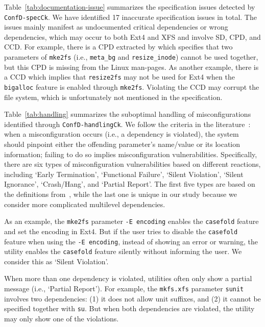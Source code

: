 Table~\ref{tab:documentation-issue} summarizes the specification issues detected by  \texttt{ConfD-specCk}.
We have identified 17 inaccurate specification issues in total.
The issues mainly manifest as undocumented critical dependencies or wrong dependencies, which may occur to both Ext4 and XFS and involve SD, CPD, and CCD. For example, there is a CPD extracted by \prj which specifies that two  parameters of   \texttt{mke2fs} (i.e., \texttt{meta\_bg} and \texttt{resize\_inode})  cannot be used together, but this CPD is missing from the Linux man-pages.
 As another example, there is a CCD which implies that \texttt{resize2fs} may not be used for Ext4 when the \texttt{bigalloc} feature is enabled through \texttt{mke2fs}. Violating the CCD may corrupt the file system, which is unfortunately not mentioned in the specification. 

Table~\ref{tab:handling} summarizes the suboptimal handling of misconfigurations identified through \texttt{ConfD-handlingCk}. 
We follow the criteria in the literature~\cite{spex}: when a misconfiguration occurs (i.e., a dependency is violated),  the system should pinpoint either the offending parameter's name/value or its location information; failing to do so implies misconfiguration vulnerabilities. 
Specifically, there are six types of misconfiguration vulnerabilities based on different reactions, including  
`Early Termination', `Functional Failure', `Silent Violation',  `Silent Ignorance', `Crash/Hang', and `Partial Report'. The first five types are based on the definitions from~\cite{spex}, while the last one is unique in our study because we consider more complicated multilevel dependencies.   

As an example, the \texttt{mke2fs} parameter \texttt{-E encoding}  enables the \texttt{casefold} feature and set the encoding in Ext4. But if the user tries to disable the \texttt{casefold} feature when using the \texttt{-E encoding}, instead of showing an error or warning, the utility enables the \texttt{casefold} feature silently without informing the user. We consider this as  `Silent Violation'.

When more than one dependency is violated, utilities often only show a partial message (i.e., `Partial Report'). 
For example, the \texttt{mkfs.xfs} parameter \texttt{sunit}  involves two dependencies:
(1) it does not allow unit suffixes, and (2) it cannot be specified together with \texttt{su}. But when both dependencies are violated, the utility may only show one of the violations.


